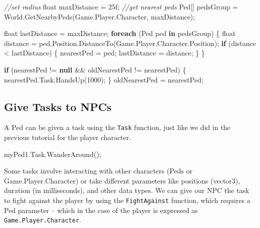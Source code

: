 \documentclass[
  openany]{book}
\newenvironment{Shaded}{\begin{snugshade}}{\end{snugshade}}
\newcommand{\CommentTok}[1]{\textcolor[rgb]{0.56,0.35,0.01}{\textit{#1}}}
\newcommand{\DataTypeTok}[1]{\textcolor[rgb]{0.13,0.29,0.53}{#1}}
\newcommand{\DecValTok}[1]{\textcolor[rgb]{0.00,0.00,0.81}{#1}}
\newcommand{\FunctionTok}[1]{\textcolor[rgb]{0.00,0.00,0.00}{#1}}
\newcommand{\KeywordTok}[1]{\textcolor[rgb]{0.13,0.29,0.53}{\textbf{#1}}}
\newcommand{\NormalTok}[1]{#1}
\begin{document}
\begin{Shaded}
\begin{Highlighting}[]
\CommentTok{//set radius}
\DataTypeTok{float}\NormalTok{ maxDistance = 25f;}
\CommentTok{//get nearest peds      }
\NormalTok{Ped[] pedsGroup = World.}\FunctionTok{GetNearbyPeds}\NormalTok{(Game.}\FunctionTok{Player}\NormalTok{.}\FunctionTok{Character}\NormalTok{, maxDistance);}
 
\DataTypeTok{float}\NormalTok{ lastDistance = maxDistance;}
\KeywordTok{foreach}\NormalTok{ (Ped ped }\KeywordTok{in}\NormalTok{ pedsGroup)}
\NormalTok{\{}
    \DataTypeTok{float}\NormalTok{ distance = ped.}\FunctionTok{Position}\NormalTok{.}\FunctionTok{DistanceTo}\NormalTok{(Game.}\FunctionTok{Player}\NormalTok{.}\FunctionTok{Character}\NormalTok{.}\FunctionTok{Position}\NormalTok{);}
    \KeywordTok{if}\NormalTok{ (distance < lastDistance)}
\NormalTok{    \{}
\NormalTok{        nearestPed = ped;}
\NormalTok{        lastDistance = distance;}
\NormalTok{    \}}
\NormalTok{\}}

    \KeywordTok{if}\NormalTok{ (nearestPed != }\KeywordTok{null}\NormalTok{ && oldNearestPed != nearestPed)}
\NormalTok{    \{}
\NormalTok{        nearestPed.}\FunctionTok{Task}\NormalTok{.}\FunctionTok{HandsUp}\NormalTok{(}\DecValTok{1000}\NormalTok{);}
\NormalTok{    \}}
\NormalTok{oldNearestPed = nearestPed;}
\end{Highlighting}
\end{Shaded}

\hypertarget{give-tasks-to-npcs}{%
\subsection*{Give Tasks to NPCs}\label{give-tasks-to-npcs}}

A Ped can be given a task using the \texttt{Task} function, just like we did in the previous tutorial for the player character.

\begin{Shaded}
\begin{Highlighting}[]
\NormalTok{myPed1.}\FunctionTok{Task}\NormalTok{.}\FunctionTok{WanderAround}\NormalTok{();}
\end{Highlighting}
\end{Shaded}

Some tasks involve interacting with other characters (Peds or Game.Player.Character) or take different parameters like positions (vector3), duration (in milliseconds), and other data types.
We can give our NPC the task to fight against the player by using the \texttt{FightAgainst} function, which requires a Ped parameter -- which in the case of the player is expressed as \texttt{Game.Player.Character}.
\end{document}
